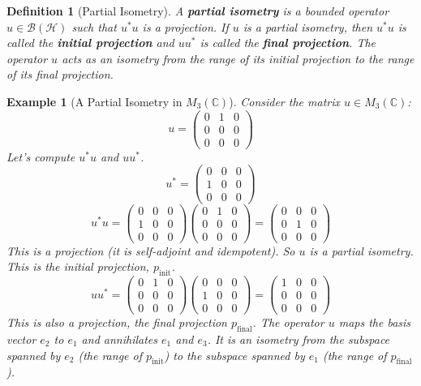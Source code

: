\documentclass[11pt, a4paper]{article}
\theoremstyle{colored_def}
\newtheorem{definition}{Definition}[section]
\theoremstyle{colored_thm}
\theoremstyle{colored_ex}
\newtheorem{example}{Example}[section]
\newcommand{\C}{\mathbb{C}}
\newcommand{\Hil}{\mathcal{H}}
\newcommand{\B}{\mathcal{B}}
\begin{document}
\begin{definition}[Partial Isometry]
A \textbf{partial isometry} is a bounded operator $u \in \B(\Hil)$ such that $u^*u$ is a projection. If $u$ is a partial isometry, then $u^*u$ is called the \textbf{initial projection} and $uu^*$ is called the \textbf{final projection}. The operator $u$ acts as an isometry from the range of its initial projection to the range of its final projection.
\end{definition}

\begin{example}[A Partial Isometry in $M_3(\C)$]
Consider the matrix $u \in M_3(\C)$:
$$ u = \begin{pmatrix} 0 & 1 & 0 \\ 0 & 0 & 0 \\ 0 & 0 & 0 \end{pmatrix} $$
Let's compute $u^*u$ and $uu^*$.
$$ u^* = \begin{pmatrix} 0 & 0 & 0 \\ 1 & 0 & 0 \\ 0 & 0 & 0 \end{pmatrix} $$
$$ u^*u = \begin{pmatrix} 0 & 0 & 0 \\ 1 & 0 & 0 \\ 0 & 0 & 0 \end{pmatrix} \begin{pmatrix} 0 & 1 & 0 \\ 0 & 0 & 0 \\ 0 & 0 & 0 \end{pmatrix} = \begin{pmatrix} 0 & 0 & 0 \\ 0 & 1 & 0 \\ 0 & 0 & 0 \end{pmatrix} $$
This is a projection (it is self-adjoint and idempotent). So $u$ is a partial isometry. This is the initial projection, $p_{\text{init}}$.
$$uu^* = \begin{pmatrix} 0 & 1 & 0 \\ 0 & 0 & 0 \\ 0 & 0 & 0 \end{pmatrix} \begin{pmatrix} 0 & 0 & 0 \\ 1 & 0 & 0 \\ 0 & 0 & 0 \end{pmatrix} = \begin{pmatrix} 1 & 0 & 0 \\ 0 & 0 & 0 \\ 0 & 0 & 0 \end{pmatrix} $$
This is also a projection, the final projection $p_{\text{final}}$. The operator $u$ maps the basis vector $e_2$ to $e_1$ and annihilates $e_1$ and $e_3$. It is an isometry from the subspace spanned by $e_2$ (the range of $p_{\text{init}}$) to the subspace spanned by $e_1$ (the range of $p_{\text{final}}$).
\end{example}
\end{document}
